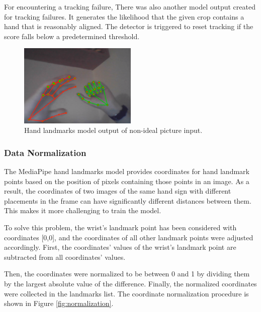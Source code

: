 For encountering a tracking failure, There was also another model output created for tracking failures. It generates the likelihood that the given crop contains a hand that is reasonably aligned. The detector is triggered to reset tracking if the score falls below a predetermined threshold.

\begin{figure}
	\centering
	\includegraphics[width = 0.5\textwidth]{images/landmarks_both_hands.png}
	\caption{Hand landmarks model output of non-ideal picture input.}
	\label{fig:landmark_both_hands}
\end{figure}


\subsubsection*{Data Normalization}\label{sec:norm}
The MediaPipe hand landmarks model provides coordinates for hand landmark points based on the position of pixels containing those points in an image. As a result, the coordinates of two images of the same hand sign with different placements in the frame can have significantly different distances between them. This makes it more challenging to train the model.

To solve this problem, the wrist's landmark point has been considered with coordinates [0,0], and the coordinates of all other landmark points were adjusted accordingly.
First, the coordinates' values of the wrist's landmark point are subtracted from all coordinates' values.

Then, the coordinates were normalized to be between 0 and 1 by dividing them by the largest absolute value of the difference. Finally, the normalized coordinates were collected in the landmarks list. The coordinate normalization procedure is shown in Figure \ref{fig:normalization}.



